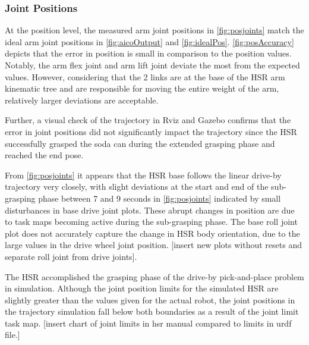 \documentclass[12pt]{article}
\begin{document}
        \subsubsection{Joint Positions} 
            At the position level, the measured arm joint positions in \cref{fig:posjoints} match the ideal arm joint positions in \cref{fig:aicoOutput} and \cref{fig:idealPos}. \cref{fig:posAccuracy} depicts that the error in position is small in comparison to the position values. Notably, the arm flex joint and arm lift joint deviate the most from the expected values. However, considering that the 2 links are at the base of the HSR arm kinematic tree and are responsible for moving the entire weight of the arm, relatively larger deviations are acceptable.
            \par Further, a visual check of the trajectory in Rviz and Gazebo confirms that the error in joint positions did not significantly impact the trajectory since the HSR successfully grasped the soda can during the extended grasping phase and reached the end pose. \par From \cref{fig:posjoints} it appears that the HSR base follows the linear drive-by trajectory very closely, with slight deviations at the start and end of the sub-grasping phase between 7 and 9 seconds in \cref{fig:posjoints} indicated by small disturbances in base drive joint plots. These abrupt changes in position are due to task maps becoming active during the sub-grasping phase. The base roll joint plot does not accurately capture the change in HSR body orientation, due to the large values in the drive wheel joint position. [insert new plots without resets and separate roll joint from drive joints].
            \par The HSR accomplished the grasping phase of the drive-by pick-and-place problem in simulation. Although the joint position limits for the simulated HSR are slightly greater than the values given for the actual robot, the joint positions in the trajectory simulation fall below both boundaries as a result of the joint limit task map. [insert chart of joint limits in hsr manual compared to limits in urdf file.]
\end{document}
